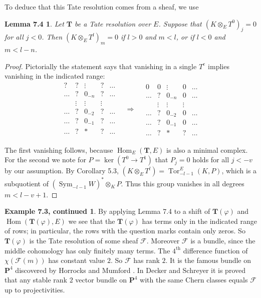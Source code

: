 \documentclass{tran-l}
\newcommand{\tensor}{\otimes}
\newcommand{\myHom}{\operatorname{Hom}}
\newcommand{\Tor}{{\operatorname{Tor}}}
\newcommand{\Sym}{\operatorname{Sym}}
\newcommand{\myth}{{\operatorname{th}}}
\newcommand{\F}{\mathcal{F}}
\newcommand{\myP}{\mathbf{P}}
\newcommand{\TT}{\mathbf{T}}
\theoremstyle{plain}
\newtheorem*{theorem28}{Lemma 7.4}
\theoremstyle{remark}
\theoremstyle{definition}
\newtheorem*{definition6}{Example 7.3, continued}
\begin{document}
To deduce that this Tate resolution comes from a sheaf, we use

\begin{theorem28} Let $\TT $ be a Tate resolution over $E$. Suppose
 that  $(K \tensor _{E} T^{0})_{j} = 0$  for all $j < 0$.
Then
$(K \tensor _{E} T^{l})_{m} = 0$  if
$ l>0$  and  $ m <l$, or if
$l<0$ and $m<l-n$.
\end{theorem28}
\begin{proof}  Pictorially the statement says that vanishing in a single $T^{e}$ implies vanishing in the
indicated range:
\begin{equation*}\begin{matrix}? &? & \vdots & ? &  \ldots \\
\ldots & ? & 0_{-n} & ? &  \ldots \\
 & \vdots & \vdots & \vdots & \\
\ldots & ? &  0_{-2} & ? &\ldots \\
\ldots & ? &  0_{-1} & ? &\ldots \\
\ldots & ? & * & ? &\ldots \\
\end{matrix}
\quad \Longrightarrow \quad \begin{matrix}0 &0 & \vdots & 0 &  \ldots \\
\ldots & ? & 0_{-n} & 0 &  \ldots \\
 & \vdots & \vdots & \vdots & \\
\ldots & ? &  0_{-2} & 0 &\ldots \\
\ldots & ? &  0_{-1} & 0 &\ldots \\
\ldots & ? & * & ? &\ldots \end{matrix}
\end{equation*}

The first vanishing follows, because  $\myHom _{E}(\TT ,E)$ is also a minimal
complex. For the second we note for $P=\ker (T^{0} \to T^{1})$
that $P_{j}=0$ holds for all $j<-v$ by our assumption. By 
Corollary 5.3,
$(K \tensor _{E} T^{l})=\Tor ^{E}_{-l-1}(K,P)$, which is a subquotient of 
$(\Sym _{-l-1} W)^{*} \tensor _{K} P$. Thus this group vanishes
in all degrees $m<l-v+1$.
\end{proof}
\begin{definition6}
By applying  Lemma 7.4 to a shift of  $\TT (\varphi )$ and\linebreak
$\myHom (\TT (\varphi ),E)$ we
see that the $\TT (\varphi )$ has  terms only in the indicated
range of rows; in particular, the rows with the question marks 
contain only zeros.  
So $\TT (\varphi )$ is the Tate resolution of some sheaf $\F $.
Moreover $\F $ is a bundle, since the middle cohomology has only finitely many
terms. The $4^{\myth }$ difference function of  $\chi (\F (m))$
has constant value $2$. So
$\F $ has rank $2$. It is the famous  bundle on $\myP ^{4}$
discovered by Horrocks and Mumford \cite{HM}. In Decker and Schreyer \cite{DS1}
 it
is proved that any stable rank $2$ vector bundle on $\myP ^{4}$ with the same
Chern classes equals $\F $ up to projectivities.
\end{definition6}
\end{document}
